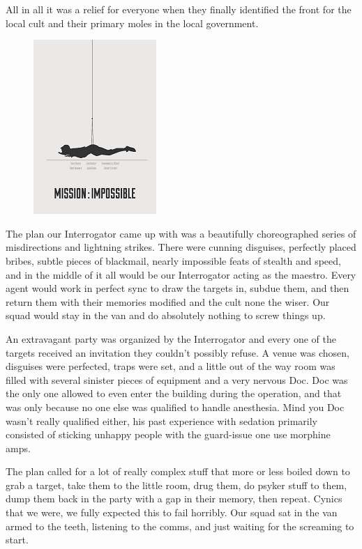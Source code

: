All in all it was a relief for everyone when they finally identified the front for the local cult and their primary moles in the local government.

\begin{figure}
	\begin{center}
		\includegraphics[width=\figwidth]{pics/5/8.png}
	\end{center}
\end{figure}
The plan our Interrogator came up with was a beautifully choreographed series of misdirections and lightning strikes. 
There were cunning disguises, perfectly placed bribes, subtle pieces of blackmail, nearly impossible feats of stealth and speed, and in the middle of it all would be our Interrogator acting as the maestro. 
Every agent would work in perfect sync to draw the targets in, subdue them, and then return them with their memories modified and the cult none the wiser. 
Our squad would stay in the van and do absolutely nothing to screw things up.

An extravagant party was organized by the Interrogator and every one of the targets received an invitation they couldn’t possibly refuse. 
A venue was chosen, disguises were perfected, traps were set, and a little out of the way room was filled with several sinister pieces of equipment and a very nervous Doc. 
Doc was the only one allowed to even enter the building during the operation, and that was only because no one else was qualified to handle anesthesia. 
Mind you Doc wasn’t really qualified either, his past experience with sedation primarily consisted of sticking unhappy people with the guard-issue one use morphine amps.

The plan called for a lot of really complex stuff that more or less boiled down to grab a target, take them to the little room, drug them, do psyker stuff to them, dump them back in the party with a gap in their memory, then repeat. 
Cynics that we were, we fully expected this to fail horribly. 
Our squad sat in the van armed to the teeth, listening to the comms, and just waiting for the screaming to start.

